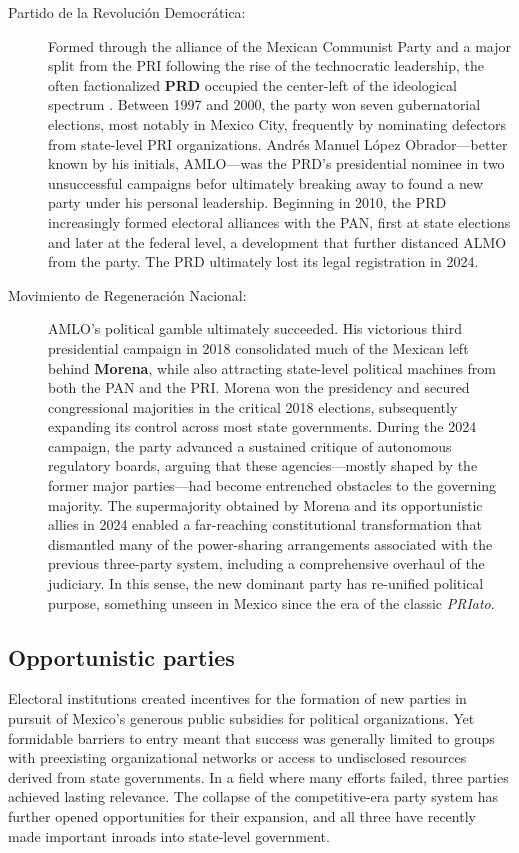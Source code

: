 \documentclass[letter,12pt]{article}
\begin{document}
\begin{description}
\item[Partido de la Revolución Democrática:] Formed through the alliance of the Mexican Communist Party and a major split from the PRI following the rise of the technocratic leadership, the often factionalized \textbf{PRD} occupied the center-left of the ideological spectrum \citep{bruhn.1997, cantuCSG2019apsr}. Between 1997 and 2000, the party won seven gubernatorial elections, most notably in Mexico City, frequently by nominating defectors from state-level PRI organizations. Andrés Manuel López Obrador---better known by his initials, AMLO---was the PRD's presidential nominee in two unsuccessful campaigns befor ultimately breaking away to found a new party under his personal leadership. Beginning in 2010, the PRD increasingly formed electoral alliances with the PAN, first at state elections and later at the federal level, a development that further distanced ALMO from the party. The PRD ultimately lost its legal registration in 2024.

\item[Movimiento de Regeneración Nacional:] AMLO's political gamble ultimately succeeded. His victorious third presidential campaign in 2018 consolidated much of the Mexican left behind \textbf{Morena}, while also attracting state-level political machines from both the PAN and the PRI. Morena won the presidency and secured congressional majorities in the critical 2018 elections, subsequently expanding its control across most state governments. During the 2024 campaign, the party advanced a sustained critique of autonomous regulatory boards, arguing that these agencies---mostly shaped by the former major parties---had become entrenched obstacles to the governing majority. The supermajority obtained by Morena and its opportunistic allies in 2024 enabled a far-reaching constitutional transformation that dismantled many of the power-sharing arrangements associated with the previous three-party system, including a comprehensive overhaul of the judiciary. In this sense, the new dominant party has re-unified political purpose, something unseen in Mexico since the era of the classic \emph{PRIato}.
  
\end{description}

\subsection{Opportunistic parties}

Electoral institutions created incentives for the formation of new parties in pursuit of Mexico's generous public subsidies for political organizations. Yet formidable barriers to entry meant that success was generally limited to groups with preexisting organizational networks or access to undisclosed resources derived from state governments. In a field where many efforts failed, three parties achieved lasting relevance. The collapse of the competitive-era party system has further opened opportunities for their expansion, and all three have recently made important inroads into state-level government.
\end{document}
